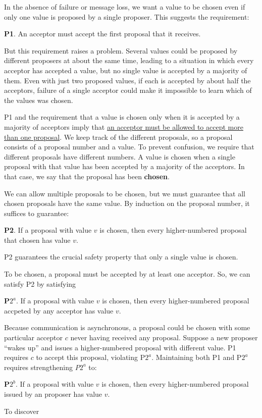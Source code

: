 \documentclass[11pt]{article}
\begin{document}
In the absence of failure or message loss, we want a value to be chosen even if only one value is
proposed by a single proposer. This suggests the requirement:

\textbf{P1}. An acceptor must accept the first proposal that it receives.

But this requirement raises a problem. Several values could be proposed by different proposers at
about the same time, leading to a situation in which every acceptor has accepted a value, but no
single value is accepted by a majority of them. Even with just two proposed values, if each is
accepted by about half the acceptors, failure of a single acceptor could make it impossible to learn
which of the values was chosen.

P1 and the requirement that a value is chosen only when it is accepted by a majority of acceptors
imply that \uline{an acceptor must be allowed to accept more than one proposal}. We keep track of the
different proposals, so a proposal consists of a proposal number and a value. To prevent confusion, we
require that different proposals have different numbers. A value is chosen when a single proposal with
that value has been accepted by a majority of the acceptors. In that case, we say that the proposal
has been \textbf{chosen}.

We can allow multiple proposals to be chosen, but we must guarantee that all chosen proposals have the
same value. By induction on the proposal number, it suffices to guarantee:

\textbf{P2}. If a proposal with value \(v\) is chosen, then every higher-numbered proposal that chosen has
value \(v\).

P2 guarantees the crucial safety property that only a single value is chosen.

To be chosen, a proposal must be accepted by at least one acceptor. So, we can satisfy P2 by
satisfying

\textbf{P\(2^a\)}. If a proposal with value \(v\) is chosen, then every higher-numbered proposal accpeted by
any acceptor has value \(v\).

Because communication is asynchronous, a proposal could be chosen with some particular acceptor \(c\)
never having received any proposal. Suppose a new proposer ``wakes up'' and issues a higher-numbered
proposal with different value. P1 requires \(c\) to accept this proposal, violating P\(2^a\).
Maintaining both P1 and P\(2^a\) requires strengthening \(P2^a\) to:

\textbf{P\(2^b\)}. If a proposal with value \(v\) is chosen, then every higher-numbered proposal issued by an
proposer has value \(v\).

To discover
\end{document}
